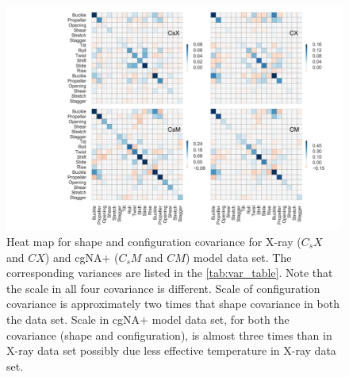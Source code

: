 \begin{figure}[H]
	\begin{center}
	\includegraphics[scale=1]{./Xray_images/C_4.png}
	\caption{Heat map for shape and configuration covariance for X-ray ($C_sX$ and $CX$) and cgNA$+$ ($C_sM$ and $CM$) model data set. The corresponding variances are listed in the \cref{tab:var_table}. Note that the scale in all four covariance is different. Scale of configuration covariance is approximately two times that shape covariance in both the data set. Scale in cgNA$+$ model data set, for both the covariance (shape and configuration), is almost three times than in X-ray data set possibly due less effective temperature in X-ray data set.  
	}
\label{SIfig:cov_4}
\end{center}
\end{figure}


